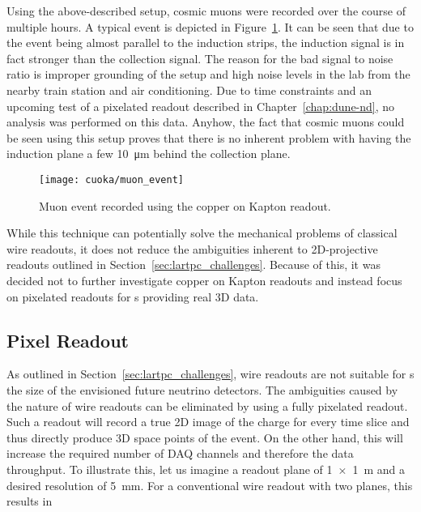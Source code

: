 Using the above-described setup, cosmic muons were recorded over the course of multiple hours.
A typical event is depicted in Figure~\ref{fig:cuoka_event}.
It can be seen that due to the event being almost parallel to the induction strips, the induction signal is in fact stronger than the collection signal.
The reason for the bad signal to noise ratio is improper grounding of the setup and high noise levels in the lab from the nearby train station and air conditioning.
Due to time constraints and an upcoming test of a pixelated readout described in Chapter~\ref{chap:dune-nd}, no analysis was performed on this data.
Anyhow, the fact that cosmic muons could be seen using this setup proves that there is no inherent problem with having the induction plane a few \SI{10}{\micro\metre} behind the collection plane.

\begin{figure}[htb]
	\centering
	\texttt{[image: cuoka/muon\_event]}
	\caption{Muon event recorded using the copper on Kapton readout.}
	\label{fig:cuoka_event}
\end{figure}

While this technique can potentially solve the mechanical problems of classical wire readouts, it does not reduce the ambiguities inherent to 2D-projective readouts outlined in Section~\ref{sec:lartpc_challenges}.
Because of this, it was decided not to further investigate copper on Kapton readouts and instead focus on pixelated readouts for \lartpc{}s providing real 3D data.


\subsection{Pixel Readout}
\label{sec:studies_charge-ro_pixel}

As outlined in Section~\ref{sec:lartpc_challenges}, wire readouts are not suitable for \lartpc{}s the size of the envisioned future neutrino detectors.
The ambiguities caused by the nature of wire readouts can be eliminated by using a fully pixelated readout.
Such a readout will record a true 2D image of the charge for every time slice and thus directly produce 3D space points of the event.
On the other hand, this will increase the required number of DAQ channels and therefore the data throughput.
To illustrate this, let us imagine a readout plane of \SI{1 x 1}{\metre} and a desired resolution of \SI{5}{\milli\metre}.
For a conventional wire readout with two planes, this results in


